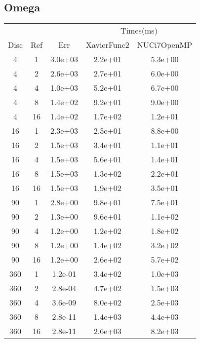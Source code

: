 \subsection{Omega}
\begin{center}
  \begin{tabular}{c|c|c|c|c}
      &&&\multicolumn{2}{|c}{Times(ms)}\\
    Disc&Ref&Err&XavierFunc2&NUCi7OpenMP\\
    \hline
    4&1&3.0e+03&2.2e+01&5.3e+00\\
    4&2&2.6e+03&2.7e+01&6.0e+00\\
    4&4&1.0e+03&5.2e+01&6.7e+00\\
    4&8&1.4e+02&9.2e+01&9.0e+00\\
    4&16&1.4e+02&1.7e+02&1.2e+01\\
    \hline
    16&1&2.3e+03&2.5e+01&8.8e+00\\
    16&2&1.5e+03&3.4e+01&1.1e+01\\
    16&4&1.5e+03&5.6e+01&1.4e+01\\
    16&8&1.5e+03&1.3e+02&2.2e+01\\
    16&16&1.5e+03&1.9e+02&3.5e+01\\
    \hline
    90&1&2.8e+00&9.8e+01&7.5e+01\\
    90&2&1.3e+00&9.6e+01&1.1e+02\\
    90&4&1.2e+00&1.2e+02&1.8e+02\\
    90&8&1.2e+00&1.4e+02&3.2e+02\\
    90&16&1.2e+00&2.6e+02&5.7e+02\\
    \hline
    360&1&1.2e-01&3.4e+02&1.0e+03\\
    360&2&2.8e-04&4.7e+02&1.5e+03\\
    360&4&3.6e-09&8.0e+02&2.5e+03\\
    360&8&2.8e-11&1.4e+03&4.4e+03\\
    360&16&2.8e-11&2.6e+03&8.2e+03\\
    \hline
  \end{tabular}
\end{center}








